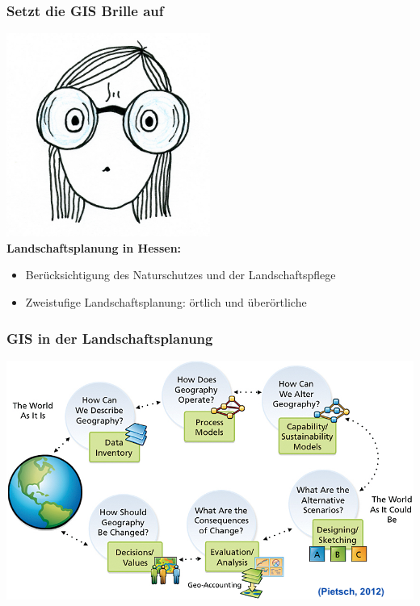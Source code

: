 \documentclass{beamer}
\begin{document}
\begin{frame}
\frametitle{Setzt die GIS Brille auf}
\centering
\includegraphics[width=0.5\textwidth]{Figures/GIglass.png}\\
\pause
\textbf{Landschaftsplanung in Hessen:}\footnotesize
\begin{itemize}
\item Berücksichtigung des Naturschutzes und der Landschaftspflege
\item Zweistufige Landschaftsplanung: örtlich und überörtliche
\end{itemize}
\end{frame}


\begin{frame}
\frametitle{GIS in der Landschaftsplanung}
\centering
\includegraphics[width=1.07\textwidth]{Figures/gis_app.png}
\end{frame}

\end{document}

